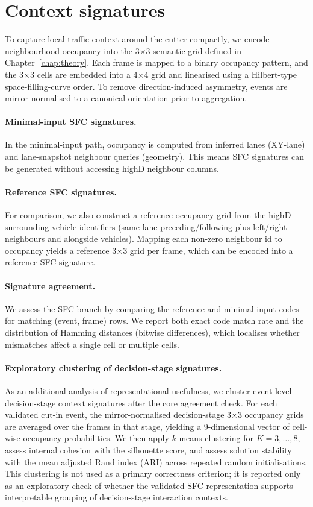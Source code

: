 \documentclass[12pt,a4paper,twoside,openright]{report}
\begin{document}
    \section{Context signatures}
    \label{sec:context-signatures-method}
    To capture local traffic context around the cutter compactly, we encode neighbourhood occupancy into the 3$\times$3 semantic grid defined in Chapter~\ref{chap:theory}. Each frame is mapped to a binary occupancy pattern, and the 3$\times$3 cells are embedded into a 4$\times$4 grid and linearised using a Hilbert-type space-filling-curve order. To remove direction-induced asymmetry, events are mirror-normalised to a canonical orientation prior to aggregation.

    \paragraph{Minimal-input SFC signatures.}
    In the minimal-input path, occupancy is computed from inferred lanes (XY-lane) and lane-snapshot neighbour queries (geometry). This means SFC signatures can be generated without accessing highD neighbour columns.

    \paragraph{Reference SFC signatures.}
    For comparison, we also construct a reference occupancy grid from the highD surrounding-vehicle identifiers (same-lane preceding/following plus left/right neighbours and alongside vehicles). Mapping each non-zero neighbour id to occupancy yields a reference 3$\times$3 grid per frame, which can be encoded into a reference SFC signature.

    \paragraph{Signature agreement.}
    We assess the SFC branch by comparing the reference and minimal-input codes for matching (event, frame) rows. We report both exact code match rate and the distribution of Hamming distances (bitwise differences), which localises whether mismatches affect a single cell or multiple cells.

    \paragraph{Exploratory clustering of decision-stage signatures.}
    As an additional analysis of representational usefulness, we cluster event-level decision-stage context signatures after the core agreement check. For each validated cut-in event, the mirror-normalised decision-stage 3$\times$3 occupancy grids are averaged over the frames in that stage, yielding a 9-dimensional vector of cell-wise occupancy probabilities. We then apply $k$-means clustering for $K=3,\dots,8$, assess internal cohesion with the silhouette score, and assess solution stability with the mean adjusted Rand index (ARI) across repeated random initialisations. This clustering is not used as a primary correctness criterion; it is reported only as an exploratory check of whether the validated SFC representation supports interpretable grouping of decision-stage interaction contexts.
\end{document}
